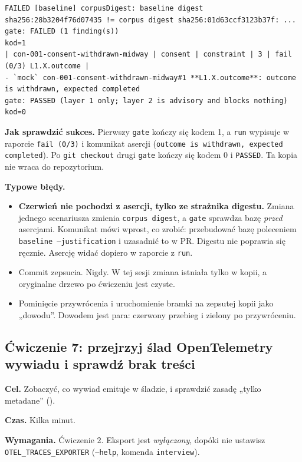 {\begin{Verbatim}[fontsize=\scriptsize,frame=single,framesep=2mm]
FAILED [baseline] corpusDigest: baseline digest sha256:28b3204f76d07435 != corpus digest sha256:01d63ccf3123b37f: ...
gate: FAILED (1 finding(s))
kod=1
| con-001-consent-withdrawn-midway | consent | constraint | 3 | fail (0/3) L1.X.outcome |
- `mock` con-001-consent-withdrawn-midway#1 **L1.X.outcome**: outcome is withdrawn, expected completed
gate: PASSED (layer 1 only; layer 2 is advisory and blocks nothing)
kod=0
\end{Verbatim}

\textbf{Jak sprawdzić sukces.} Pierwszy \texttt{gate} kończy się kodem 1, a
\texttt{run} wypisuje w raporcie \texttt{fail (0/3)} i komunikat asercji
(\texttt{outcome is withdrawn, expected completed}). Po \texttt{git checkout} drugi
\texttt{gate} kończy się kodem 0 i \texttt{PASSED}. Ta kopia nie wraca do repozytorium.

\textbf{Typowe błędy.}
\begin{itemize}[leftmargin=*,itemsep=1pt]
  \item \textbf{Czerwień nie pochodzi z asercji, tylko ze strażnika digestu.} Zmiana
        jednego scenariusza zmienia \texttt{corpus digest}, a \texttt{gate} sprawdza
        bazę \emph{przed} asercjami. Komunikat mówi wprost, co zrobić: przebudować
        bazę poleceniem \texttt{baseline --justification} i uzasadnić to w PR. Digestu
        nie poprawia się ręcznie. Asercję widać dopiero w raporcie z \texttt{run}.
  \item Commit zepsucia. Nigdy. W tej sesji zmiana istniała tylko w kopii, a
        oryginalne drzewo po ćwiczeniu jest czyste.
  \item Pominięcie przywrócenia i uruchomienie bramki na zepsutej kopii jako „dowodu”.
        Dowodem jest para: czerwony przebieg i zielony po przywróceniu.
\end{itemize}

\subsection{Ćwiczenie 7: przejrzyj ślad OpenTelemetry wywiadu i sprawdź brak treści}

\textbf{Cel.} Zobaczyć, co wywiad emituje w śladzie, i sprawdzić zasadę
„tylko metadane” ().

\textbf{Czas.} Kilka minut.

\textbf{Wymagania.} Ćwiczenie 2. Eksport jest \emph{wyłączony}, dopóki nie ustawisz
\texttt{OTEL\_TRACES\_EXPORTER} (\texttt{--help}, komenda \texttt{interview}).

}
